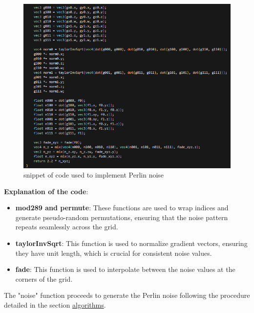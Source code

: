 \documentclass[12pt]{article}
\begin{document}
\begin{enumerate}
\begin{itemize}
        \begin{figure}[H]
            \centering
            \includegraphics[width=1\textwidth]{Images/sphere1code2.png}
            \caption{snippet of code used to implement Perlin noise}
        \end{figure}

        \textbf{Explanation of the code}:

        \begin{itemize}
            \item \textbf{mod289 and permute}:
            \newline
            These functions are used to wrap indices and generate pseudo-random permutations, ensuring that the noise pattern repeats seamlessly across the grid.

            \item \textbf{taylorInvSqrt}:
            \newline
            This function is used to normalize gradient vectors, ensuring they have unit length, which is crucial for consistent noise values.

            \item \textbf{fade}:
            \newline
            This function is used to interpolate between the noise values at the corners of the grid.        
        \end{itemize}

        The "noise" function proceeds to generate the Perlin noise following the procedure detailed in the section \hyperref[sec:algorithms]{algorithms}.
    \newpage
        

\end{itemize}
\end{enumerate}
\end{document}
